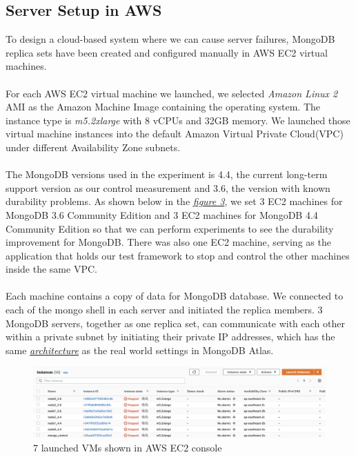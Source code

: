 \documentclass[12pt]{article}
\begin{document}
\subsection{Server Setup in AWS}
To design a cloud-based system where we can cause server failures, MongoDB replica sets have been created and configured manually in AWS EC2 virtual machines. \\
\\
For each AWS EC2 virtual machine we launched, we selected \textit{Amazon Linux 2} AMI as the Amazon Machine Image containing the operating system. The instance type is \textit{m5.2xlarge} with 8 vCPUs and 32GB memory. We launched those virtual machine instances into the default Amazon Virtual Private Cloud(VPC) under different Availability Zone subnets.\\
\\
The MongoDB versions used in the experiment is 4.4, the current long-term support version as our control measurement and 3.6, the version with known durability problems. As shown below in the \hyperref[fig:instance]{\textit{figure 3}}, we set 3 EC2 machines for MongoDB 3.6 Community Edition and 3 EC2 machines for MongoDB 4.4 Community Edition so that we can perform experiments to see the durability improvement for MongoDB. There was also one EC2 machine, serving as the application that holds our test framework to stop and control the other machines inside the same VPC.\\
\\
Each machine contains a copy of data for MongoDB database. We connected to each of the mongo shell in each server and initiated the replica members. 3 MongoDB servers, together as one replica set, can communicate with each other within a private subnet by initiating their private IP addresses, which has the same \hyperref[fig:architecture]{\textit{architecture}} as the real world settings in MongoDB Atlas. \\
\begin{figure}
  \centering
  \includegraphics[width=\textwidth]{img/instance.png}
  \caption{7 launched VMs shown in AWS EC2 console}
  \label{fig:instance}
\end{figure}
\end{document}
